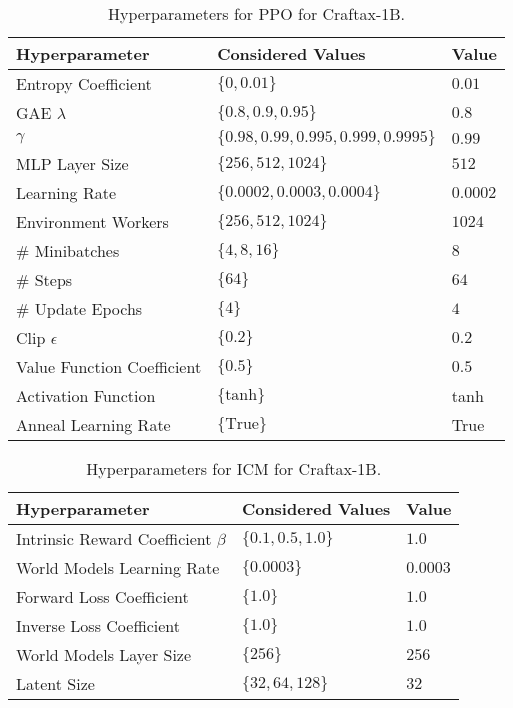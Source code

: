 \documentclass{article}
\theoremstyle{plain}
\theoremstyle{definition}
\theoremstyle{remark}
\begin{document}
\begin{table*}[t]
\centering
\begin{tabular}{@{}l l l@{}} 
    \toprule
    \textbf{Hyperparameter} & \textbf{Considered Values} & \textbf{Value} \\
    \midrule
    Entropy Coefficient & $\{0, 0.01\}$ & $0.01$ \\
    GAE $\lambda$ & $\{0.8, 0.9, 0.95\}$ & $0.8$ \\
    $\gamma$ & $\{0.98, 0.99, 0.995, 0.999, 0.9995\}$ & $0.99$ \\
    MLP Layer Size & $\{256, 512, 1024\}$ & $512$ \\
    Learning Rate & $\{0.0002, 0.0003, 0.0004\}$ & $0.0002$ \\
    Environment Workers & $\{256, 512, 1024\}$ & $1024$ \\
    \# Minibatches & $\{4, 8, 16\}$ & $8$ \\
    \# Steps & $\{64\}$ & $64$ \\
    \# Update Epochs & $\{4\}$ & $4$ \\
    Clip $\epsilon$ & $\{0.2\}$ & $0.2$ \\
    Value Function Coefficient & $\{0.5\}$ & $0.5$ \\
    Activation Function & $\{\text{tanh}\}$ & tanh \\
    Anneal Learning Rate & $\{\text{True}\}$ & True \\
    \bottomrule
\end{tabular}
\caption{Hyperparameters for PPO for Craftax-1B.}
\label{tab:craftax_1b_hyp_ppo}
\end{table*}

\begin{table*}[t]
\centering
\begin{tabular}{@{}l l l@{}} 
    \toprule
    \textbf{Hyperparameter} & \textbf{Considered Values} & \textbf{Value} \\
    \midrule
    Intrinsic Reward Coefficient $\beta$ & $\{0.1, 0.5, 1.0\}$ & $1.0$ \\
    World Models Learning Rate & $\{0.0003\}$ & $0.0003$ \\
    Forward Loss Coefficient & $\{1.0\}$ & $1.0$ \\
    Inverse Loss Coefficient & $\{1.0\}$ & $1.0$ \\
    World Models Layer Size & $\{256\}$ & $256$ \\
    Latent Size & $\{32, 64, 128\}$ & $32$ \\
    \bottomrule
\end{tabular}
\caption{Hyperparameters for ICM for Craftax-1B.}
\label{tab:craftax_1b_hyp_icm}
\end{table*}
\end{document}
